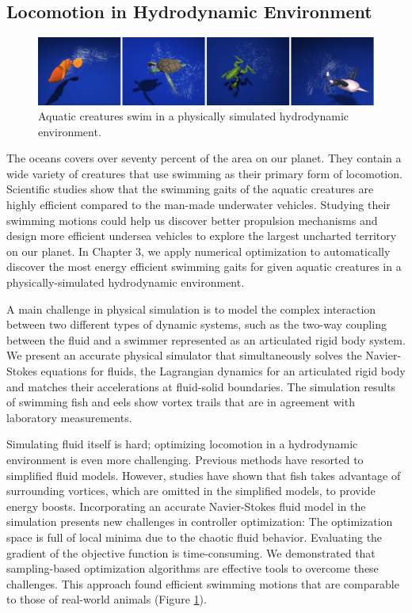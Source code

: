 \subsection{Locomotion in Hydrodynamic Environment}


\begin{figure}[!h]
  \centering
    \includegraphics[width=\textwidth]{figures/teaserSwimming.eps}
  \caption{Aquatic creatures swim in a physically simulated hydrodynamic environment.}
  \label{fig:teaser1}
\end{figure}

The oceans covers over seventy percent of the area on our planet. They contain a wide variety of creatures that use swimming as their primary form of locomotion. Scientific studies show that the swimming gaits of the aquatic creatures are highly efficient compared to the man-made underwater vehicles. Studying their swimming motions could help us discover better propulsion mechanisms and design more efficient undersea vehicles to explore the largest uncharted territory on our planet. In Chapter 3, we apply numerical optimization to automatically discover the most energy efficient swimming gaits for given aquatic creatures in a physically-simulated hydrodynamic environment.

A main challenge in physical simulation is to model the complex interaction between two different types of dynamic systems, such as the two-way coupling between the fluid and a swimmer represented as an articulated rigid body system. We present an accurate physical simulator \cite{} that simultaneously solves the Navier-Stokes equations for fluids, the Lagrangian dynamics for an articulated rigid body and matches their accelerations at fluid-solid boundaries. The simulation results of swimming fish and eels show vortex trails that are in agreement with laboratory measurements.

Simulating fluid itself is hard; optimizing locomotion in a hydrodynamic environment is even more challenging. Previous methods have resorted to simplified fluid models. However, studies have shown that fish takes advantage of surrounding vortices, which are omitted in the simplified models, to provide energy boosts. Incorporating an accurate Navier-Stokes fluid model in the simulation presents new challenges in controller optimization: The optimization space is full of local minima due to the chaotic fluid behavior. Evaluating the gradient of the objective function is time-consuming. We demonstrated that sampling-based optimization algorithms are effective tools to overcome these challenges. This approach found efficient swimming motions that are comparable to those of real-world animals (Figure \ref{fig:teaser1}). 

